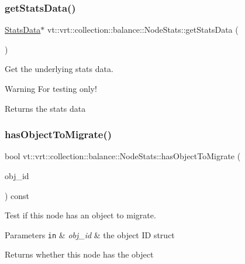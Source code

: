 \subsubsection{\texorpdfstring{get\+Stats\+Data()}{getStatsData()}}
{\footnotesize\ttfamily \hyperlink{structvt_1_1vrt_1_1collection_1_1balance_1_1_stats_data}{Stats\+Data}$\ast$ vt\+::vrt\+::collection\+::balance\+::\+Node\+Stats\+::get\+Stats\+Data (\begin{DoxyParamCaption}{ }\end{DoxyParamCaption})\hspace{0.3cm}{\ttfamily [inline]}}



Get the underlying stats data. 

\begin{DoxyWarning}{Warning}
For testing only!
\end{DoxyWarning}
\begin{DoxyReturn}{Returns}
the stats data 
\end{DoxyReturn}
\mbox{\label{structvt_1_1vrt_1_1collection_1_1balance_1_1_node_stats_a975f917ab141ad5ca7f5905fe281e412}} 
\subsubsection{\texorpdfstring{has\+Object\+To\+Migrate()}{hasObjectToMigrate()}}
{\footnotesize\ttfamily bool vt\+::vrt\+::collection\+::balance\+::\+Node\+Stats\+::has\+Object\+To\+Migrate (\begin{DoxyParamCaption}\item[{\hyperlink{namespacevt_1_1vrt_1_1collection_1_1balance_a9f5b53fafb270212279a4757d2c4cd28}{Element\+I\+D\+Struct}}]{obj\+\_\+id }\end{DoxyParamCaption}) const}



Test if this node has an object to migrate. 


\begin{DoxyParams}[1]{Parameters}
\mbox{\tt in}  & {\em obj\+\_\+id} & the object ID struct\\
\hline
\end{DoxyParams}
\begin{DoxyReturn}{Returns}
whether this node has the object 
\end{DoxyReturn}
\mbox{\label{structvt_1_1vrt_1_1collection_1_1balance_1_1_node_stats_a0c60d1566daa6465f56b09e27058d6a1}} 
